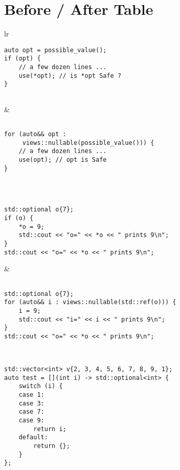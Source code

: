 \documentclass[a4paper,10pt,oneside,openany,final,article]{memoir}
\begin{document}
\chapter{Before / After Table}
\begin{tabular}{ lr }
\begin{minipage}[t]{0.45\columnwidth}
  \begin{verbatim}
auto opt = possible_value();
if (opt) {
    // a few dozen lines ...
    use(*opt); // is *opt Safe ?
}


\end{verbatim}
\end{minipage}
&
\begin{minipage}[t]{0.45\columnwidth}
\begin{verbatim}

for (auto&& opt :
     views::nullable(possible_value())) {
    // a few dozen lines ...
    use(opt); // opt is Safe
}

\end{verbatim}
\end{minipage}
\\ \midrule
\begin{minipage}[t]{0.45\columnwidth}
  \begin{verbatim}

std::optional o{7};
if (o) {
    *o = 9;
    std::cout << "o=" << *o << " prints 9\n";
}
std::cout << "o=" << *o << " prints 9\n";

\end{verbatim}
\end{minipage}
&
\begin{minipage}[t]{0.45\columnwidth}
\begin{verbatim}

std::optional o{7};
for (auto&& i : views::nullable(std::ref(o))) {
    i = 9;
    std::cout << "i=" << i << " prints 9\n";
}
std::cout << "o=" << *o << " prints 9\n";

\end{verbatim}
\end{minipage}
\\ \midrule
\begin{minipage}[t]{0.45\columnwidth}
\begin{verbatim}
std::vector<int> v{2, 3, 4, 5, 6, 7, 8, 9, 1};
auto test = [](int i) -> std::optional<int> {
    switch (i) {
    case 1:
    case 3:
    case 7:
    case 9:
        return i;
    default:
        return {};
    }
};


\end{verbatim}
\end{minipage}
\end{tabular}
\end{document}
